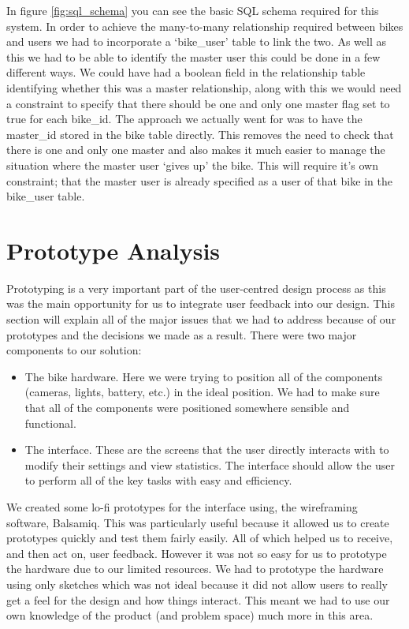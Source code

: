 \documentclass[a4paper]{report}
\begin{document}
{In figure \ref{fig:sql_schema} you can see the basic SQL schema required for this system. In order to achieve the many-to-many relationship required between bikes and users we had to incorporate a `bike\_user' table to link the two. As well as this we had to be able to identify the master user this could be done in a few different ways. We could have had a boolean field in the relationship table identifying whether this was a master relationship, along with this we would need a constraint to specify that there should be one and only one master flag set to true for each bike\_id. The approach we actually went for was to have the master\_id stored in the bike table directly. This removes the need to check that there is one and only one master and also makes it much easier to manage the situation where the master user `gives up' the bike. This will require it's own constraint; that the master user is already specified as a user of that bike in the bike\_user table.

\chapter{Prototype Analysis}
\label{ch: prototype}
Prototyping is a very important part of the user-centred design process as this was the main opportunity for us to integrate user feedback into our design. This section will explain all of the major issues that we had to address because of our prototypes and the decisions we made as a result. There were two major components to our solution:
\begin{itemize}
  \item The bike hardware. Here we were trying to position all of the components (cameras, lights, battery, etc.) in the ideal position. We had to make sure that all of the components were positioned somewhere sensible and functional.
  \item The interface. These are the screens that the user directly interacts with to modify their settings and view statistics. The interface should allow the user to perform all of the key tasks with easy and efficiency.
\end{itemize}
We created some lo-fi prototypes for the interface using, the wireframing software, Balsamiq\cite{balsamiq}. This was particularly useful because it allowed us to create prototypes quickly and test them fairly easily. All of which helped us to receive, and then act on, user feedback. However it was not so easy for us to prototype the hardware due to our limited resources. We had to prototype the hardware using only sketches which was not ideal because it did not allow users to really get a feel for the design and how things interact. This meant we had to use our own knowledge of the product (and problem space) much more in this area.

}
\end{document}
